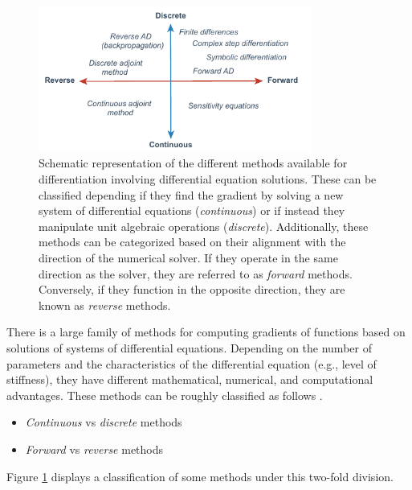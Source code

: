 \begin{figure}[t]
    \centering
    \includegraphics[width=0.80\textwidth]{figures/scheme-methods.pdf}
    \caption{Schematic representation of the different methods available for differentiation involving differential equation solutions. These can be classified depending if they find the gradient by solving a new system of differential equations (\textit{continuous}) or if instead they manipulate unit algebraic operations (\textit{discrete}). Additionally, these methods can be categorized based on their alignment with the direction of the numerical solver. If they operate in the same direction as the solver, they are referred to as \textit{forward} methods. Conversely, if they function in the opposite direction, they are known as \textit{reverse} methods.}
    \label{fig:scheme-all-methods}
\end{figure}

There is a large family of methods for computing gradients of functions based on solutions of systems of differential equations. 
Depending on the number of parameters and the characteristics of the differential equation (e.g., level of stiffness), they have different mathematical, numerical, and computational advantages.
These methods can be roughly classified as follows \cite{ma2021comparison}. 
\begin{itemize}
    \item \textit{Continuous} vs \textit{discrete}  methods
    \item \textit{Forward} vs \textit{reverse} methods
\end{itemize}
Figure \ref{fig:scheme-all-methods} displays a classification of some methods under this two-fold division. 

